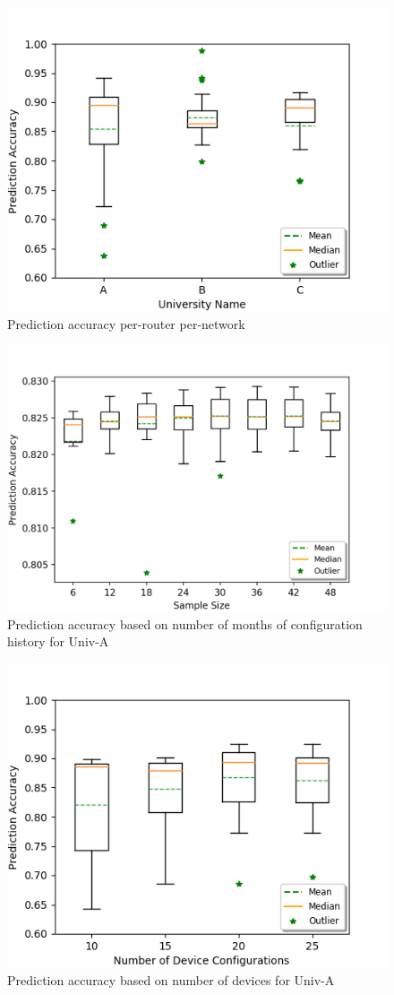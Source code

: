 \begin{figure}
    \centering
	\includegraphics[width=0.7\columnwidth]{uni_analysis.png}
	\caption{Prediction accuracy per-router per-network}
    \label{fig:uni_analysis}
\end{figure}
\begin{figure}
	\centering
	\includegraphics[width=0.7\columnwidth]{monthly_analysis.png}
	\caption{Prediction accuracy based on number of months of configuration history for Univ-A}
    \label{fig:monthly_analysis}
\end{figure}
\begin{figure}
	\centering
	\includegraphics[width=0.7\columnwidth]{device_analysis.png}
	\caption{Prediction accuracy based on number of devices for Univ-A}
    \label{fig:device_analysis}
\end{figure}

